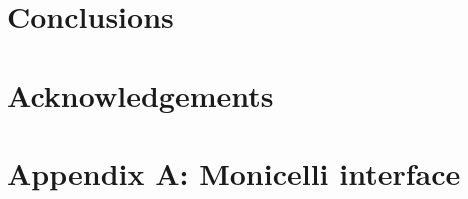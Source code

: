 \documentclass[preprint,3p,10pt]{elsarticle}
\begin{document}
\section{Conclusions}


\section*{Acknowledgements}

\section{Appendix A: Monicelli interface}




\end{document}
